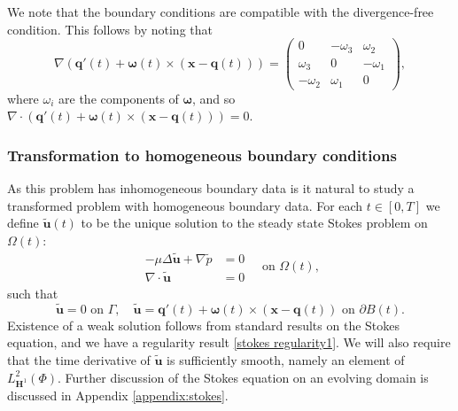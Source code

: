 \documentclass[a4paper]{amsart}
\numberwithin{equation}{section}
\newcommand{\grad}{\nabla}
\newcommand{\Div}{\nabla \cdot}
\theoremstyle{plain}
\newcommand{\mbf}[1]{\mathbf{#1}}
\begin{document}
We note that the boundary conditions are compatible with the divergence-free condition.
This follows by noting that
\[ \grad \left( \mbf{q}'(t) + \boldsymbol{\omega}(t) \times (\mbf{x} - \mbf{q}(t)) \right) = \begin{pmatrix}
	0 & -\omega_3 & \omega_2\\
	\omega_3 & 0 & -\omega_1\\
	-\omega_2 & \omega_1 & 0
\end{pmatrix}, \]
where $\omega_i$ are the components of $\boldsymbol{\omega}$, and so $\Div \left( \mbf{q}'(t) + \boldsymbol{\omega}(t) \times (\mbf{x} - \mbf{q}(t))\right) = 0$. 

\subsubsection{Transformation to homogeneous boundary conditions}
As this problem has inhomogeneous boundary data is it natural to study a transformed problem with homogeneous boundary data.
For each $t \in [0,T]$ we define $\widetilde{\mbf{u}}(t)$ to be the unique solution to the steady state Stokes problem on $\Omega(t)$:
\begin{equation}
    \begin{aligned}
        -\mu \Delta \widetilde{\mbf{u}} + \grad \widetilde{p} &= 0\\
    \Div \widetilde{\mbf{u}} &= 0
    \end{aligned} \quad \text{on } \Omega(t),
    \label{eqn: stokes eqn}
\end{equation}
such that
\[ \widetilde{\mbf{u}} = 0 \text{ on } \Gamma, \quad \widetilde{\mbf{u}} = \mbf{q}'(t) + \boldsymbol{\omega}(t)\times(\mbf{x} - \mbf{q}(t)) \text{ on } \partial B(t). \]
Existence of a weak solution follows from standard results on the Stokes equation, and we have a regularity result \eqref{stokes regularity1}.
We will also require that the time derivative of $\widetilde{\mbf{u}}$ is sufficiently smooth, namely an element of $L^2_{\mbf{H}^1}(\Phi)$.
Further discussion of the Stokes equation on an evolving domain is discussed in Appendix \ref{appendix:stokes}.
\end{document}
